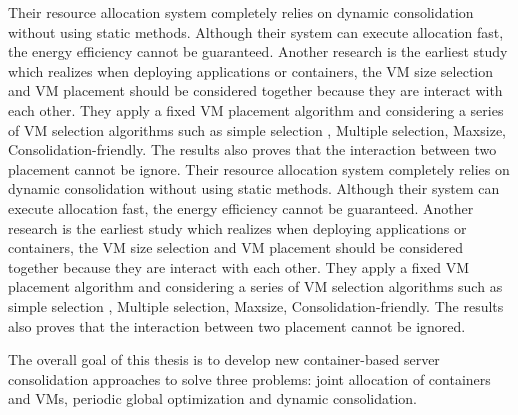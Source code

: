 Their resource allocation system completely relies on dynamic consolidation without using static methods. Although their system can execute allocation fast, the energy efficiency cannot be guaranteed. Another research  \cite{Mann:2016hx} is the earliest study which realizes when deploying applications or containers, the VM size selection and VM placement should be considered together because they are interact with each other. They apply a fixed VM placement algorithm and considering a series of VM selection algorithms such as simple selection \cite{Ganesan:2012eb},  Multiple selection, Maxsize, Consolidation-friendly. The results also proves that the interaction between two placement cannot be ignore.
Their resource allocation system completely relies on dynamic consolidation without using static methods. Although their system can execute allocation fast, the energy efficiency cannot be guaranteed. Another research  \cite{Mann:2016hx} is the earliest study which realizes when deploying applications or containers, the VM size selection and VM placement should be considered together because they are interact with each other. They apply a fixed VM placement algorithm and considering a series of VM selection algorithms such as simple selection \cite{Ganesan:2012eb},  Multiple selection, Maxsize, Consolidation-friendly. The results also proves that the interaction between two placement cannot be ignored.







The overall goal of this thesis is to develop new container-based server consolidation approaches to solve three problems: joint allocation of containers  and VMs, periodic global optimization and dynamic consolidation. 
